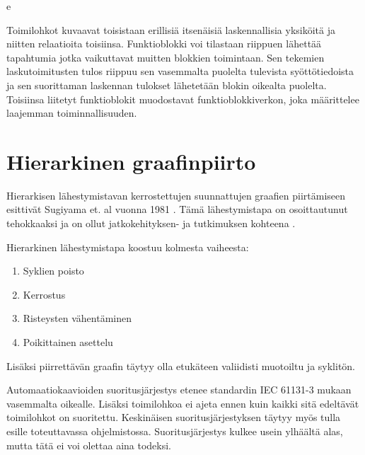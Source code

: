 e	\documentclass[finnish,12pt]{article}
\begin{document}
Toimilohkot kuvaavat toisistaan erillisiä itsenäisiä laskennallisia yksiköitä
ja niitten relaatioita toisiinsa. Funktioblokki voi tilastaan riippuen lähettää
tapahtumia jotka vaikuttavat muitten blokkien toimintaan. Sen tekemien
laskutoimitusten tulos riippuu sen vasemmalta puolelta tulevista
syöttötiedoista ja sen suorittaman laskennan tulokset lähetetään blokin oikealta puolelta.
Toisiinsa liitetyt funktioblokit muodostavat funktioblokkiverkon, joka määrittelee laajemman toiminnallisuuden.



	\clearpage
	\section{Hierarkinen graafinpiirto}

Hierarkisen lähestymistavan kerrostettujen suunnattujen graafien piirtämiseen
esittivät Sugiyama et. al vuonna 1981 \cite{RefWorks:9}. Tämä lähestymistapa on
osoittautunut tehokkaaksi ja on ollut jatkokehityksen- ja tutkimuksen kohteena
\cite{RefWorks:28}.

Hierarkinen lähestymistapa koostuu kolmesta vaiheesta:
\begin{enumerate}
  \item Syklien poisto
  \item Kerrostus
  \item Risteysten vähentäminen
  \item Poikittainen asettelu
\end{enumerate}
Lisäksi piirrettävän graafin täytyy olla etukäteen valiidisti muotoiltu ja syklitön.

Automaatiokaavioiden suoritusjärjestys etenee standardin IEC 61131-3 mukaan
vasemmalta oikealle. Lisäksi toimilohkoa ei ajeta ennen kuin kaikki sitä edeltävät toimilohkot on suoritettu.
Keskinäisen suoritusjärjestyksen täytyy myös tulla esille toteuttavassa ohjelmistossa.
Suoritusjärjestys kulkee usein ylhäältä alas, mutta tätä ei voi olettaa aina todeksi.
\end{document}
